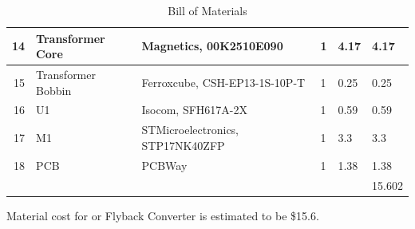 \begin{table}[H]
{\begin{tabular}{|r|l|l|l|l|l|}
14                     & Transformer Core                    & Magnetics, 00K2510E090            & 1        & 4.17       & 4.17        \\ \hline
15                     & Transformer Bobbin                  & Ferroxcube, CSH-EP13-1S-10P-T     & 1        & 0.25       & 0.25        \\ \hline
16                     & U1                                  & Isocom, SFH617A-2X                & 1        & 0.59       & 0.59        \\ \hline
17                     & M1                                  & STMicroelectronics,  STP17NK40ZFP & 1        & 3.3        & 3.3         \\ \hline
18                     & PCB                                 & PCBWay                            & 1        & 1.38        & 1.38         \\ \hline
\multicolumn{1}{|l|}{} &                                     &                                   &          &            & 15.602      \\ \hline
\end{tabular}}
\caption{Bill of Materials}
\end{table}

Material cost for or Flyback Converter is estimated to be \$15.6.

\newpage